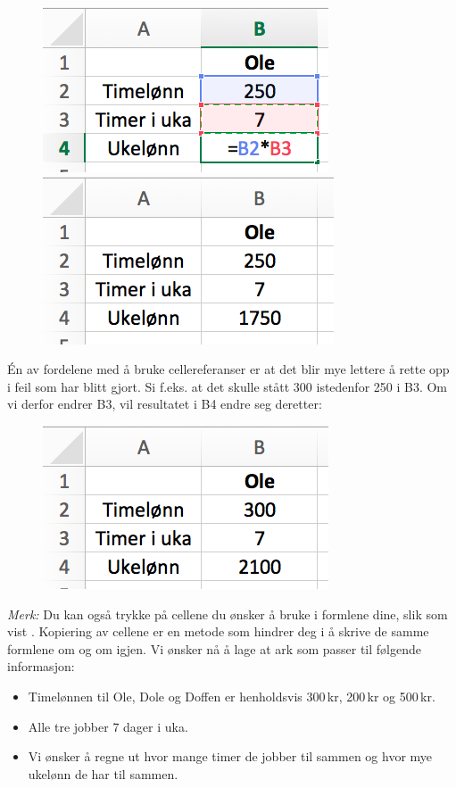 \begin{figure}[H]
	\centering
	\includegraphics[scale=0.3]{figs/ex5}\qquad
	\includegraphics[scale=0.3]{figs/ex4}
\end{figure}
Én av fordelene med å bruke cellereferanser er at det blir mye lettere å rette opp i feil som har blitt gjort. Si f.eks. at det skulle stått 300 istedenfor 250 i B3. Om vi derfor endrer B3, vil resultatet i B4 endre seg deretter:
\begin{figure}[H]
	\centering
	\includegraphics[scale=0.3]{figs/ex6}
\end{figure}
\textsl{Merk:} Du kan også trykke på cellene du ønsker å bruke i formlene dine, slik som vist .
Kopiering av cellene er en metode som hindrer deg i å skrive de samme formlene om og om igjen. Vi ønsker nå å lage at ark som passer til følgende informasjon:
\begin{itemize}
	\item Timelønnen til Ole, Dole og Doffen er henholdsvis 300\,kr, 200\,kr og 500\,kr.
	\item Alle tre jobber 7 dager i uka.
	\item Vi ønsker å regne ut hvor mange timer de jobber til sammen og hvor mye ukelønn de har til sammen.
\end{itemize}

